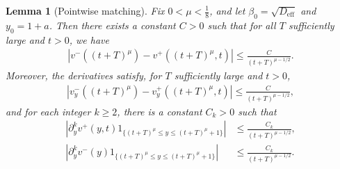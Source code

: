 \documentclass[11pt]{article}
\newtheorem{lemma}[prop]{Lemma}
\numberwithin{equation}{section}
\numberwithin{prop}{section}
\newcommand{\Deff}{D_\mathrm{eff}}
\begin{document}
\begin{lemma}[Pointwise matching]\label{l: colinear pointwise matching}
	Fix $0 < \mu < \frac{1}{8}$, and let $\beta_0 = \sqrt{\Deff}$ and $y_0 = 1+a$. Then there exists a constant $C >0$ such that for all $T$ sufficiently large and $t>0$, we have
	\begin{align}
	|v^- ((t+T)^\mu) - v^+ ((t+T)^\mu, t) | \leq \frac{C}{(t+T)^{\mu-1/2}}. \label{e: colinear matching estimate}
	\end{align}
	Moreover, the derivatives satisfy, for $T$ sufficiently large and $t > 0$,
	\begin{align}
	| v^-_y((t+T)^\mu) - v^+_y((t+T)^\mu, t) | \leq \frac{C}{(t+T)^{\mu-1/2}}, \label{e: colinear matching derivative estimate}
	\end{align}
	and for each integer $k \geq 2$, there is a constant $C_k > 0$ such that
	\begin{align}
	|\partial_y^k v^+ (y, t) 1_{\{(t+T)^\mu \leq y \leq (t+T)^\mu +1\}}| &\leq \frac{C_k}{(t+T)^{\mu- 1/2}}, \label{e:colinear higher derivative estimate 1}\\
	|\partial_y^k v^- (y)  1_{\{(t+T)^\mu \leq y \leq (t+T)^\mu +1\}}| &\leq \frac{C_k}{(t+T)^{\mu-1/2}}. \label{e: colinear higher derivative estimate 2}
	\end{align}
\end{lemma}
\end{document}
